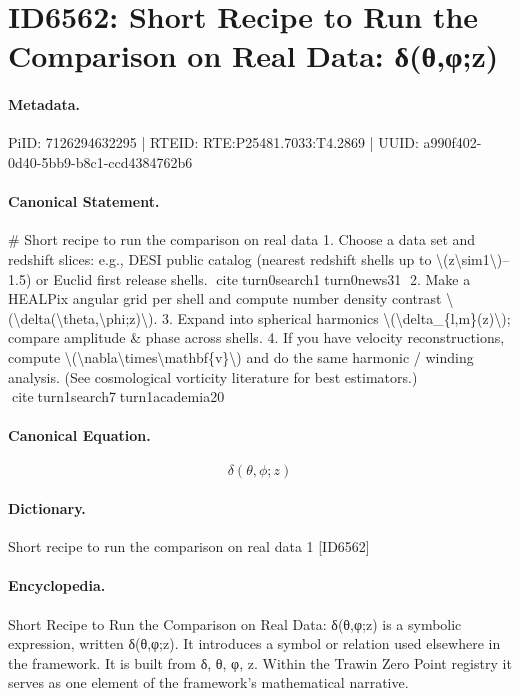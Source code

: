 \section*{ID6562: Short Recipe to Run the Comparison on Real Data: δ(θ,φ;z)}
\paragraph{Metadata.}
PiID: 7126294632295 | RTEID: RTE:P25481.7033:T4.2869 | UUID: a990f402-0d40-5bb9-b8c1-ccd4384762b6

\paragraph{Canonical Statement.}
\# Short recipe to run the comparison on real data 1. Choose a data set and redshift slices: e.g., DESI public catalog (nearest redshift shells up to \textbackslash{}(z\textbackslash{}sim1\textbackslash{})–1.5) or Euclid first release shells. citeturn0search1turn0news31 2. Make a HEALPix angular grid per shell and compute number density contrast \textbackslash{}(\textbackslash{}delta(\textbackslash{}theta,\textbackslash{}phi;z)\textbackslash{}). 3. Expand into spherical harmonics \textbackslash{}(\textbackslash{}delta\_\{l,m\}(z)\textbackslash{}); compare amplitude \& phase across shells. 4. If you have velocity reconstructions, compute \textbackslash{}(\textbackslash{}nabla\textbackslash{}times\textbackslash{}mathbf\{v\}\textbackslash{}) and do the same harmonic / winding analysis. (See cosmological vorticity literature for best estimators.) citeturn1search7turn1academia20

\paragraph{Canonical Equation.}
\[
\delta(\theta,\phi;z)
\]

\paragraph{Dictionary.}
Short recipe to run the comparison on real data 1 [ID6562]

\paragraph{Encyclopedia.}
Short Recipe to Run the Comparison on Real Data: δ(θ,φ;z) is a symbolic expression, written δ(θ,φ;z). It introduces a symbol or relation used elsewhere in the framework. It is built from δ, θ, φ, z. Within the Trawin Zero Point registry it serves as one element of the framework's mathematical narrative.
